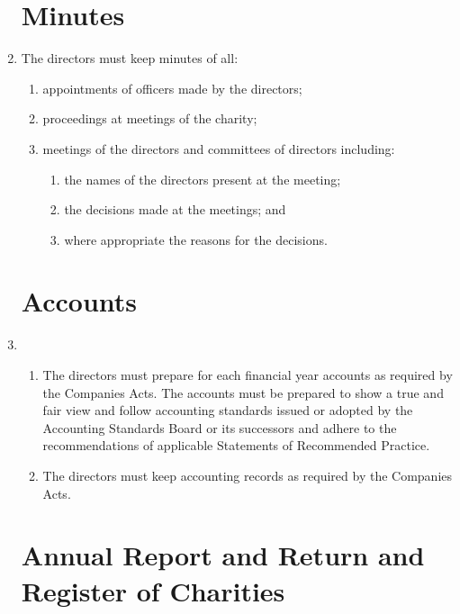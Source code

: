 \begin{enumerate}
\section{Minutes}

\item
  The directors must keep minutes of all:
  \begin{enumerate}
  \item
    appointments of officers made by the directors;
  \item
    proceedings at meetings of the charity;
  \item
    meetings of the directors and committees of directors including:
    \begin{enumerate}
    \item
      the names of the directors present at the meeting;
    \item
      the decisions made at the meetings; and
    \item
      where appropriate the reasons for the decisions.
    \end{enumerate}
  \end{enumerate}

\section{Accounts}

\item
  \begin{enumerate}
  \item
    The directors must prepare for each financial year accounts as
    required by the Companies Acts. The accounts must be prepared to
    show a true and fair view and follow accounting standards issued or
    adopted by the Accounting Standards Board or its successors and
    adhere to the recommendations of applicable Statements of
    Recommended Practice.
  \item
    The directors must keep accounting records as required by the
    Companies Acts.
  \end{enumerate}

\section{Annual Report and Return and Register of Charities}


\end{enumerate}
